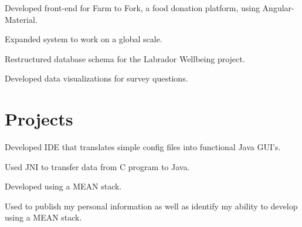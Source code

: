 \documentclass[letterpaper]{deedy-resume} %
\begin{document}
\begin{minipage}[t]{0.66\textwidth}


\begin{tightitemize}
\item Developed front-end for Farm to Fork, a food donation platform, using Angular-Material.
\item Expanded system to work on a global scale.
\end{tightitemize}

\sectionspace %


\begin{tightitemize}
\item Restructured database schema for the Labrador Wellbeing project.
\item Developed data visualizations for survey questions.
\end{tightitemize}

\sectionspace %




\section{Projects}



\begin{tightitemize}
\item Developed IDE that translates simple config files into functional Java GUI's.
\item Used JNI to transfer data from C program to Java.
\end{tightitemize}
\sectionspace %


\begin{tightitemize}
\item Developed using a MEAN stack.
\item Used to publish my personal information as well as identify my ability to develop using a MEAN stack.
\end{tightitemize}
\sectionspace %



\end{minipage}
\end{document}
